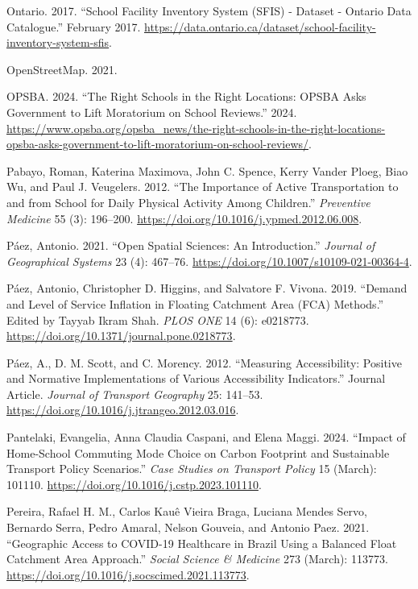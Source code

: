 \documentclass[
default
]{sn-jnl}
\newlength{\cslhangindent}
\newenvironment{CSLReferences}[2] %
 {\begin{list}{}{%
  \setlength{\itemindent}{0pt}
  \setlength{\leftmargin}{0pt}
  \setlength{\parsep}{0pt}
  \ifodd #1
   \setlength{\leftmargin}{\cslhangindent}
   \setlength{\itemindent}{-1\cslhangindent}
  \fi
  \setlength{\itemsep}{#2\baselineskip}}}
 {\end{list}}
\begin{document}
\begin{CSLReferences}{1}{0}
Ontario. 2017. {``School Facility Inventory System ({SFIS}) - Dataset -
Ontario Data Catalogue.''} February 2017.
\url{https://data.ontario.ca/dataset/school-facility-inventory-system-sfis}.

OpenStreetMap. 2021.

OPSBA. 2024. {``The Right Schools in the Right Locations: {OPSBA} Asks
Government to Lift Moratorium on School Reviews.''} 2024.
\url{https://www.opsba.org/opsba_news/the-right-schools-in-the-right-locations-opsba-asks-government-to-lift-moratorium-on-school-reviews/}.

Pabayo, Roman, Katerina Maximova, John C. Spence, Kerry Vander Ploeg,
Biao Wu, and Paul J. Veugelers. 2012. {``The Importance of Active
Transportation to and from School for Daily Physical Activity Among
Children.''} \emph{Preventive Medicine} 55 (3): 196--200.
\url{https://doi.org/10.1016/j.ypmed.2012.06.008}.

Páez, Antonio. 2021. {``Open Spatial Sciences: An Introduction.''}
\emph{Journal of Geographical Systems} 23 (4): 467--76.
\url{https://doi.org/10.1007/s10109-021-00364-4}.

Páez, Antonio, Christopher D. Higgins, and Salvatore F. Vivona. 2019.
{``Demand and Level of Service Inflation in Floating Catchment Area
(FCA) Methods.''} Edited by Tayyab Ikram Shah. \emph{PLOS ONE} 14 (6):
e0218773. \url{https://doi.org/10.1371/journal.pone.0218773}.

Páez, A., D. M. Scott, and C. Morency. 2012. {``Measuring Accessibility:
Positive and Normative Implementations of Various Accessibility
Indicators.''} Journal Article. \emph{Journal of Transport Geography}
25: 141--53. \url{https://doi.org/10.1016/j.jtrangeo.2012.03.016}.

Pantelaki, Evangelia, Anna Claudia Caspani, and Elena Maggi. 2024.
{``Impact of Home-School Commuting Mode Choice on Carbon Footprint and
Sustainable Transport Policy Scenarios.''} \emph{Case Studies on
Transport Policy} 15 (March): 101110.
\url{https://doi.org/10.1016/j.cstp.2023.101110}.

Pereira, Rafael H. M., Carlos Kauê Vieira Braga, Luciana Mendes Servo,
Bernardo Serra, Pedro Amaral, Nelson Gouveia, and Antonio Paez. 2021.
{``Geographic Access to {COVID}-19 Healthcare in Brazil Using a Balanced
Float Catchment Area Approach.''} \emph{Social Science \& Medicine} 273
(March): 113773. \url{https://doi.org/10.1016/j.socscimed.2021.113773}.


\end{CSLReferences}
\end{document}
